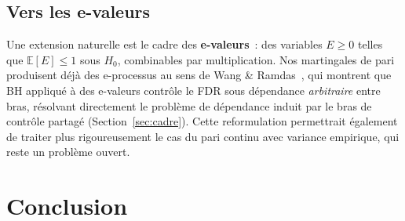 \documentclass[10.5pt,a4paper]{article}
\begin{document}
\subsection{Vers les e-valeurs}

Une extension naturelle est le cadre des \textbf{e-valeurs}~: des variables
$E \geq 0$ telles que $\mathbb{E}[E] \leq 1$ sous $H_0$, combinables par
multiplication. Nos martingales de pari produisent déjà des e-processus
au sens de Wang \& Ramdas~\cite{wang2022}, qui montrent que BH appliqué
à des e-valeurs contrôle le FDR sous dépendance \emph{arbitraire} entre
bras, résolvant directement le problème de dépendance induit par le bras
de contrôle partagé (Section~\ref{sec:cadre}). Cette reformulation
permettrait également de traiter plus rigoureusement le cas du pari
continu avec variance empirique, qui reste un problème ouvert.



\section{Conclusion}
\label{sec:conclusion}
\end{document}
